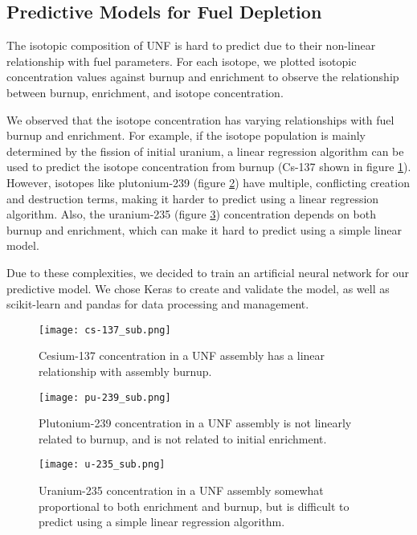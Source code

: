 \subsection{Predictive Models for Fuel Depletion}

The isotopic composition of \gls{UNF} is hard to predict due to their
non-linear relationship with fuel parameters. For each
isotope, we plotted isotopic concentration values against
burnup and enrichment to observe the relationship between
burnup, enrichment, and isotope concentration.

We observed that the isotope concentration has varying
relationships with fuel burnup and enrichment.
For example, if the isotope population is mainly determined by
the fission of initial uranium, a linear regression algorithm
can be used to predict the isotope concentration from burnup
(Cs-137 shown in figure \ref{fig:cs_137}).
However, isotopes like plutonium-239 (figure \ref{fig:pu_239}) have multiple, conflicting creation
and destruction terms, making it harder to predict using a
linear regression algorithm. Also, the uranium-235 (figure \ref{fig:u_235}) concentration
depends on both burnup and enrichment, which can make it
hard to predict using a simple linear model.

Due to these complexities, we decided to train an artificial
neural network for our predictive model. We chose
Keras to create and validate the model, as well as scikit-learn
and pandas for data processing and management.

\begin{figure}
    \centering
    \texttt{[image: cs-137\_sub.png]}
    \caption{Cesium-137 concentration in a \gls{UNF} assembly
             has a linear relationship with assembly burnup.}
    \label{fig:cs_137}
\end{figure}

\begin{figure}
    \centering
    \texttt{[image: pu-239\_sub.png]}
    \caption{Plutonium-239 concentration in a \gls{UNF} assembly
             is not linearly related to burnup, and is
             not related to initial enrichment.}
    \label{fig:pu_239}
\end{figure}


\begin{figure}
    \centering
    \texttt{[image: u-235\_sub.png]}
    \caption{Uranium-235 concentration in a \gls{UNF} assembly
             somewhat proportional to both enrichment and
             burnup, but is difficult to predict using
             a simple linear regression algorithm.}
    \label{fig:u_235}
\end{figure}


